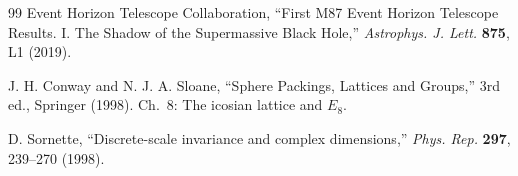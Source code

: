 \documentclass[12pt,a4paper]{article}
\begin{document}
\begin{thebibliography}{99}
Event Horizon Telescope Collaboration, ``First M87 Event Horizon Telescope Results. I. The Shadow of the Supermassive Black Hole,'' \textit{Astrophys. J. Lett.} \textbf{875}, L1 (2019).


J. H. Conway and N. J. A. Sloane, ``Sphere Packings, Lattices and Groups,'' 3rd ed., Springer (1998). Ch.~8: The icosian lattice and $E_8$.


D. Sornette, ``Discrete-scale invariance and complex dimensions,'' \textit{Phys. Rep.} \textbf{297}, 239--270 (1998).

\end{thebibliography}
\end{document}
